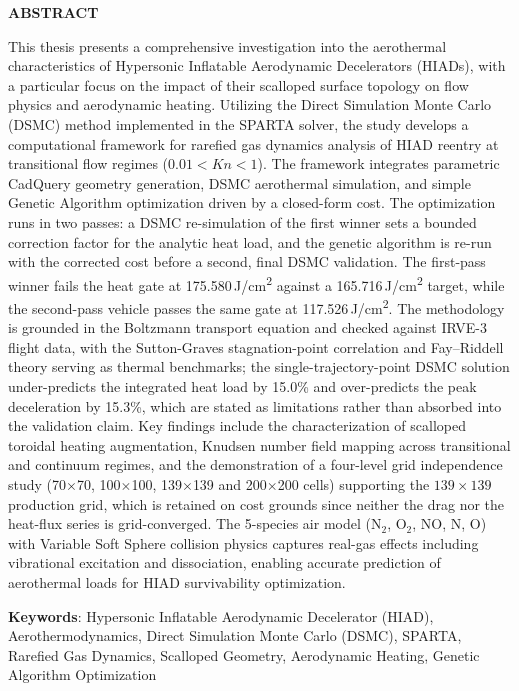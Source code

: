 \clearpage
{}
{}
\begin{center}
\textbf{\large  ABSTRACT}\\[0.5cm]
\end{center}

This thesis presents a comprehensive investigation into the aerothermal characteristics of Hypersonic Inflatable Aerodynamic Decelerators (HIADs), with a particular focus on the impact of their scalloped surface topology on flow physics and aerodynamic heating. Utilizing the Direct Simulation Monte Carlo (DSMC) method implemented in the SPARTA solver, the study develops a computational framework for rarefied gas dynamics analysis of HIAD reentry at transitional flow regimes ($0.01 < Kn < 1$). The framework integrates parametric CadQuery geometry generation, DSMC aerothermal simulation, and simple Genetic Algorithm optimization driven by a closed-form cost. The optimization runs in two passes: a DSMC re-simulation of the first winner sets a bounded correction factor for the analytic heat load, and the genetic algorithm is re-run with the corrected cost before a second, final DSMC validation. The first-pass winner fails the heat gate at 175.580\,J/cm\textsuperscript{2} against a 165.716\,J/cm\textsuperscript{2} target, while the second-pass vehicle passes the same gate at 117.526\,J/cm\textsuperscript{2}. The methodology is grounded in the Boltzmann transport equation and checked against IRVE-3 flight data, with the Sutton-Graves stagnation-point correlation and Fay--Riddell theory serving as thermal benchmarks; the single-trajectory-point DSMC solution under-predicts the integrated heat load by 15.0\% and over-predicts the peak deceleration by 15.3\%, which are stated as limitations rather than absorbed into the validation claim. Key findings include the characterization of scalloped toroidal heating augmentation, Knudsen number field mapping across transitional and continuum regimes, and the demonstration of a four-level grid independence study (70$\times$70, 100$\times$100, 139$\times$139 and 200$\times$200 cells) supporting the $139\times139$ production grid, which is retained on cost grounds since neither the drag nor the heat-flux series is grid-converged. The 5-species air model (N$_2$, O$_2$, NO, N, O) with Variable Soft Sphere collision physics captures real-gas effects including vibrational excitation and dissociation, enabling accurate prediction of aerothermal loads for HIAD survivability optimization.

\noindent \textbf{Keywords}: Hypersonic Inflatable Aerodynamic Decelerator (HIAD), Aerothermodynamics, Direct Simulation Monte Carlo (DSMC), SPARTA, Rarefied Gas Dynamics, Scalloped Geometry, Aerodynamic Heating, Genetic Algorithm Optimization